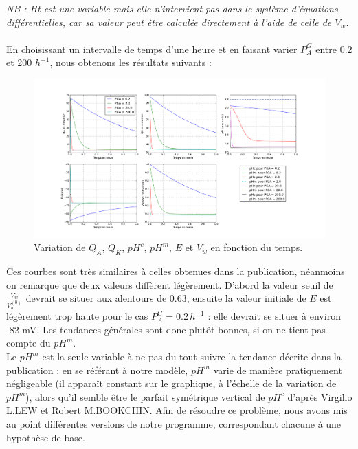 \documentclass[a4paper,fleqn]{article}
\begin{document}
\textit{NB : Ht est une variable mais elle n'intervient pas dans le système d'équations différentielles, car sa valeur peut être calculée directement à l'aide de celle de $V_w$.}\\
\\

En choisissant un intervalle de temps d'une heure et en faisant varier $P_{A}^{G}$ entre 0.2 et 200 $h^{-1}$, nous obtenons les résultats suivants :

\begin{figure}[H]
\centering 
\includegraphics[width=1.1\textwidth]{original_hum.png}
\caption{Variation de $Q_{A}$, $Q_{K}$, $pH^{c}$, $pH^{m}$, $E$ et $V_{w}$ en fonction du temps.}
\end{figure} 

 


Ces courbes sont très similaires à celles obtenues dans la publication, néanmoins on remarque que deux valeurs diffèrent légèrement. D'abord la valeur seuil de $\frac{V_w}{V_w^{(0)}}$ devrait se situer aux alentours de 0.63, ensuite la valeur initiale de $E$ est légèrement trop haute pour le cas $P_{A}^{G} = 0.2\,h^{-1}$ : elle devrait se situer à environ -82 mV. Les tendances générales sont donc plutôt bonnes, si on ne tient pas compte du $pH^m$.\\

Le $pH^m$ est la seule variable à ne pas du tout suivre la tendance décrite dans la publication : en se référant à notre modèle, $pH^m$ varie de manière pratiquement négligeable (il apparaît constant sur le graphique, à l'échelle de la variation de $pH^m$), alors qu'il semble être le parfait symétrique vertical de $pH^c$ d'après Virgilio L.LEW et Robert M.BOOKCHIN. Afin de résoudre ce problème, nous avons mis au point différentes versions de notre programme, correspondant chacune à une hypothèse de base.
\end{document}
